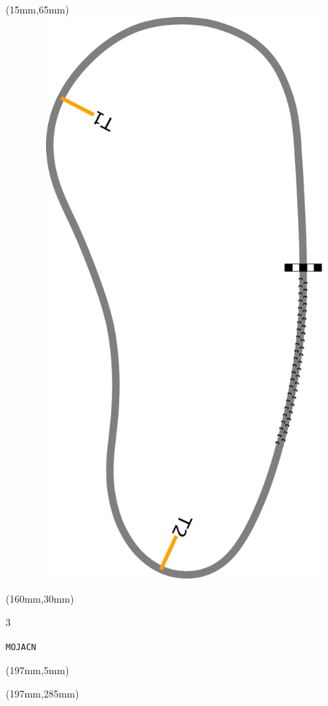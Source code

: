 \begin{textblock*}{185mm}(15mm,65mm)%
\centering
\mbox{\includegraphics[width=185mm,height=210mm,keepaspectratio]{PT/MOJACN.pdf}}
\end{textblock*}
\begin{textblock*}{40mm}(160mm,30mm)%
\Large
\par{} 
\par3 
\par\hfill\tiny\tt MOJACN\\
\end{textblock*}
\begin{textblock*}{20mm}(197mm,5mm)%
\fbox{\thepage}
\label{MOJACN}
\end{textblock*}
\begin{textblock*}{20mm}(197mm,285mm)%
\fbox{\thepage}
\end{textblock*}

